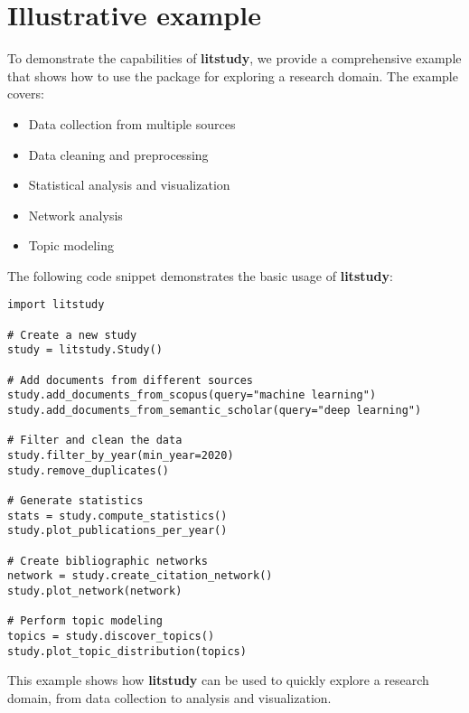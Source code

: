 \section{Illustrative example}

To demonstrate the capabilities of \textbf{litstudy}, we provide a comprehensive example that shows how to use the package for exploring a research domain. The example covers:

\begin{itemize}
\item Data collection from multiple sources
\item Data cleaning and preprocessing
\item Statistical analysis and visualization
\item Network analysis
\item Topic modeling
\end{itemize}

The following code snippet demonstrates the basic usage of \textbf{litstudy}:

\begin{verbatim}
import litstudy

# Create a new study
study = litstudy.Study()

# Add documents from different sources
study.add_documents_from_scopus(query="machine learning")
study.add_documents_from_semantic_scholar(query="deep learning")

# Filter and clean the data
study.filter_by_year(min_year=2020)
study.remove_duplicates()

# Generate statistics
stats = study.compute_statistics()
study.plot_publications_per_year()

# Create bibliographic networks
network = study.create_citation_network()
study.plot_network(network)

# Perform topic modeling
topics = study.discover_topics()
study.plot_topic_distribution(topics)
\end{verbatim}

This example shows how \textbf{litstudy} can be used to quickly explore a research domain, from data collection to analysis and visualization.
